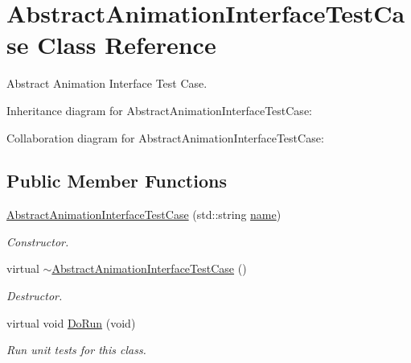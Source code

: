 \hypertarget{classAbstractAnimationInterfaceTestCase}{}\section{Abstract\+Animation\+Interface\+Test\+Case Class Reference}
\label{classAbstractAnimationInterfaceTestCase}


Abstract Animation Interface Test Case.  




Inheritance diagram for Abstract\+Animation\+Interface\+Test\+Case\+:


Collaboration diagram for Abstract\+Animation\+Interface\+Test\+Case\+:
\subsection*{Public Member Functions}
\begin{DoxyCompactItemize}
\item 
\hyperlink{classAbstractAnimationInterfaceTestCase_a58715234a8eb227151cbb4a60b5e038a}{Abstract\+Animation\+Interface\+Test\+Case} (std\+::string \hyperlink{generate__test__data__lte__spectrum__model_8m_ab74e6bf80237ddc4109968cedc58c151}{name})
\begin{DoxyCompactList}\small\item\em Constructor. \end{DoxyCompactList}\item 
virtual \hyperlink{classAbstractAnimationInterfaceTestCase_ab0cc19061de812a1036fc692b510a96b}{$\sim$\+Abstract\+Animation\+Interface\+Test\+Case} ()
\begin{DoxyCompactList}\small\item\em Destructor. \end{DoxyCompactList}\item 
virtual void \hyperlink{classAbstractAnimationInterfaceTestCase_a02ca1adeab1908d17b9db4134530d516}{Do\+Run} (void)
\begin{DoxyCompactList}\small\item\em Run unit tests for this class. \end{DoxyCompactList}\end{DoxyCompactItemize}
